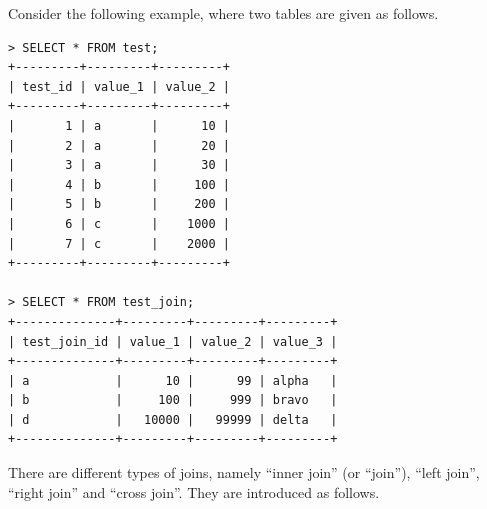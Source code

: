 Consider the following example, where two tables are given as follows.
\begin{lstlisting}
> SELECT * FROM test;
+---------+---------+---------+
| test_id | value_1 | value_2 |
+---------+---------+---------+
|       1 | a       |      10 |
|       2 | a       |      20 |
|       3 | a       |      30 |
|       4 | b       |     100 |
|       5 | b       |     200 |
|       6 | c       |    1000 |
|       7 | c       |    2000 |
+---------+---------+---------+

> SELECT * FROM test_join;
+--------------+---------+---------+---------+
| test_join_id | value_1 | value_2 | value_3 |
+--------------+---------+---------+---------+
| a            |      10 |      99 | alpha   |
| b            |     100 |     999 | bravo   |
| d            |   10000 |   99999 | delta   |
+--------------+---------+---------+---------+
\end{lstlisting}

There are different types of joins, namely ``inner join'' (or ``join''), ``left join'', ``right join'' and ``cross join''. They are introduced as follows.

